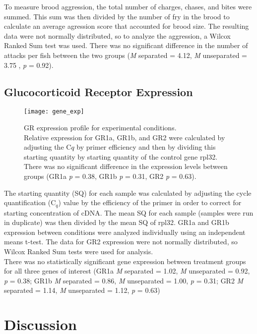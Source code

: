 \documentclass[12pt,twoside]{reedthesis}
\begin{document}
To measure brood aggression, the total number of charges, chases, and
bites were summed. This sum was then divided by the number of fry in the brood
to calculate an average agression score that accounted for brood size. The
resulting data were not normally distributed, so to analyze the aggression, a Wilcox Ranked Sum test was used. There was no
significant difference in the number of attacks per fish between the two groups (\textit{M} separated = 4.12, \textit{M} unseparated = 3.75 , \textit{p} = 0.92).

\section{Glucocorticoid Receptor Expression}

\begin{figure}[htbp] 
\begin{center} 
\texttt{[image: gene\_exp]}
\caption[GR expression profile for experimental
conditions]{\footnotesize{GR expression profile for experimental
      conditions.\\ Relative expression for GR1a, GR1b, and GR2 were calculated
  by adjusting the C$q$ by primer efficiency and then by dividing this starting
  quantity by starting quantity of the control gene rpl32. There was no
  significant difference in the expression levels between groups (GR1a
  \textit{p} = 0.38, GR1b \textit{p} = 0.31, GR2 \textit{p} = 0.63).}}
\label{subd}
\end{center} 
\end{figure}

The starting quantity (SQ) for each sample was calculated by adjusting the cycle
quantification (C$_{q}$)
value by the efficiency of the primer in order to
correct for starting concentration of cDNA. The 
mean SQ for each sample (samples were run in duplicate) was then divided by the mean SQ
of rpl32. GR1a and GR1b expression between conditions were analyzed individually using an independent means
t-test. The data for GR2 expression were not normally distributed, so Wilcox Ranked Sum tests
were used for analysis.\\
There was no statistically significant gene expression between treatment groups
for all three genes of interest (GR1a \textit{M} separated = 1.02, \textit{M}
unseparated = 0.92, \textit{p} = 0.38; GR1b \textit{M} separated = 0.86, \textit{M}
unseparated = 1.00, \textit{p} = 0.31; GR2 \textit{M} separated = 1.14, \textit{M}
unseparated = 1.12, \textit{p} = 0.63)
\chapter{Discussion}
\end{document}

